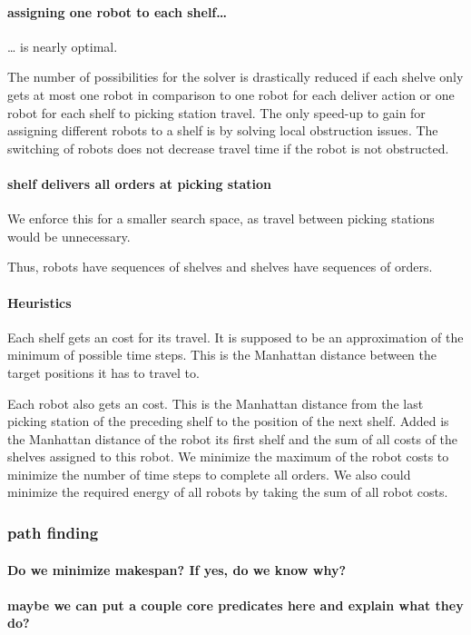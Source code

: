 \paragraph{assigning one robot to each shelf\ldots{}}
\label{sec:org2cc82fe}
\ldots{} is nearly optimal.

     The number of possibilities for the solver is drastically reduced if each shelve only gets at most one robot in comparison to one robot for each deliver action or one robot for each shelf to picking station travel.
The only speed-up to gain for assigning different robots to a shelf is by solving local obstruction issues.
The switching of robots does not decrease travel time if the robot is not obstructed.
\paragraph{shelf delivers all orders at picking station}
\label{sec:org1731faf}

We enforce this for a smaller search space, as travel between picking stations would be unnecessary.

Thus, robots have sequences of shelves and shelves have sequences of orders.
\paragraph{Heuristics}
\label{sec:orgce6203c}
Each shelf gets an cost for its travel.
It is supposed to be an approximation of the minimum of possible time steps.
This is the Manhattan distance between the target positions it has to travel to.

Each robot also gets an cost.
This is the Manhattan distance from the last picking station of the preceding shelf to the position of the next shelf.
Added is the Manhattan distance of the robot its first shelf and the sum of all costs of the shelves assigned to this robot.
We minimize the maximum of the robot costs to minimize the number of time steps to complete all orders.
We also could minimize the required energy of all robots by taking the sum of all robot costs.
\subsubsection{path finding}
\label{sec:org46a5473}
\paragraph{Do we minimize makespan? If yes, do we know why?}
\label{sec:org1bcffe5}
\paragraph{maybe we can put a couple core predicates here and explain what they do?}
\label{sec:orgab4d90b}
